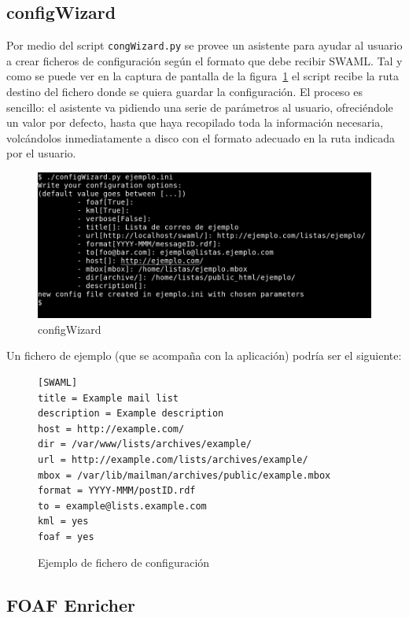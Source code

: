 \subsection*{configWizard}

Por medio del script \texttt{congWizard.py} se provee un asistente para
ayudar al usuario a crear ficheros de configuración según el formato
que debe recibir SWAML. Tal y como se puede ver en la captura de pantalla
de la figura~\ref{fig:configWizard} el script recibe la ruta destino del 
fichero donde se quiera guardar la configuración. El proceso es sencillo: 
el asistente va pidiendo una serie de parámetros al usuario, ofreciéndole
un valor por defecto, hasta que haya recopilado toda la información necesaria,
volcándolos inmediatamente a disco con el formato adecuado en la ruta 
indicada por el usuario.

\begin{figure}[H]
	\centering
	\includegraphics[width=14cm]{images/screenshots/configWizard.png}
	\caption{configWizard}
	\label{fig:configWizard}
\end{figure}

Un fichero de ejemplo (que se acompaña con la aplicación) podría ser el
siguiente:

\begin{figure}[H]
\begin{lstlisting}
[SWAML]
title = Example mail list
description = Example description
host = http://example.com/
dir = /var/www/lists/archives/example/
url = http://example.com/lists/archives/example/
mbox = /var/lib/mailman/archives/public/example.mbox
format = YYYY-MMM/postID.rdf
to = example@lists.example.com
kml = yes
foaf = yes
\end{lstlisting}
\caption{Ejemplo de fichero de configuración}
\label{fig:ejemplo-config}
\end{figure}

\subsection*{FOAF Enricher}

